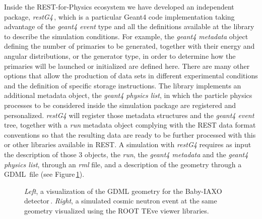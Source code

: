 Inside the REST-for-Physics ecosystem we have developed an independent package, \emph{restG4}\,\cite{REST_restG4_Git}, which is a particular Geant4 code implementation taking advantage of the \emph{geant4 event} type and all the definitions available at the library to describe the simulation conditions. For example, the \emph{geant4 metadata} object defining the number of primaries to be generated, together with their energy and angular distributions, or the generator type, in order to determine how the primaries will be launched or initialized are defined here. There are many other options that allow the production of data sets in different experimental conditions and the definition of specific storage instructions. The library implements an additional metadata object, the \emph{geant4 physics list}, in which the particle physics processes to be considered inside the simulation package are registered and personalized. \emph{restG4} will register those metadata structures and the \emph{geant4 event} tree, together with a \emph{run} metadata object complying with the REST data format conventions so that the resulting data are ready to be further processed with this or other libraries available in REST. A simulation with \emph{restG4} requires as input the description of those 3 objects, the \emph{run}, the \emph{geant4 metadata} and the \emph{geant4 physics list}, through an \emph{rml} file, and a description of the geometry through a GDML\,\cite{Chytracek:2006be} file (see Figure\,\ref{fig:geant4lib}).



\begin{figure}[htb!]
  \centering
	\caption{\emph{Left}, a visualization of the GDML geometry for the Baby-IAXO detector\,\cite{BabyIAXO:2020mzw}. \emph{Right}, a simulated cosmic neutron event at the same geometry visualized using the ROOT TEve viewer libraries.}\label{fig:geant4lib}
\end{figure}

